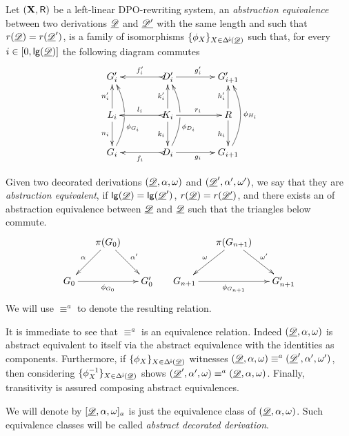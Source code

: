 \begin{definition}Let $(\textbf {\textup{X}}, \mathsf{R})$ be a left-linear DPO-rewriting system,  an \emph{abstraction equivalence} between two derivations $\underline{\mathscr{D}}$ and $\underline{\mathscr{D'}}$ with the same length and such that $r(\underline{\mathscr{D}})=r(\underline{\mathscr{D}}')$, is a family of isomorphisms $\{\phi_X\}_{X\in \Delta^{\hspace{-1pt}\downarrow\hspace{-1pt}}(\underline{\mathscr{D}})}$ such that, for every $i\in [0, \mathsf{lg}(\underline{\mathscr{D}})]$ the following diagram commutes
	\[\xymatrix@C=40pt{G'_i&D'_i \ar[r]^{g'_i} \ar@{>->}[l]_{f'_i}&G'_{i+1}\\  L_i \ar[u]^{n'_i} \ar[d]_{n_i}& K_i \ar[u]^{k'_i} \ar[d]_{k_i} \ar[r]^{r_i} \ar@{>->}[l]_{l_i} &R\ar[u]^{h'_i} \ar[d]_{h_i}\\G_i \ar@/_.45cm/[uu]_(.35){\phi_{G_i}}|\hole&D_i\ar@{>->}[l]^{f_i}\ar@/_.45cm/[uu]_(.35){\phi_{D_i}}|\hole \ar[r]_{g_i}&G_{i+1}\ar@/_.45cm/[uu]_{\phi_{H_i}}}\]
	
	Given two decorated derivations $(\underline{\mathscr{D}}, \alpha, \omega)$ and $(\underline{\mathscr{D}}', \alpha', \omega')$, we say that they are \emph{abstraction equivalent}, if $\mathsf{lg}(\underline{\mathscr{D}})=\mathsf{lg}(\underline{\mathscr{D}}')$, $r(\underline{\mathscr{D}})=r(\underline{\mathscr{D'}})$, and there exists an of abstraction equivalence between $\underline{\mathscr{D}}$ and  $\underline{\mathscr{D}}$ such that the triangles below commute.
	\[\xymatrix@C=15pt{&\pi(G_0) \ar[dr]^{\alpha'} \ar[dl]_{\alpha}&&& \pi(G_{n+1}) \ar[dr]^{\omega'} \ar[dl]_{\omega}\\ G_0 \ar[rr]_{\phi_{G_0}} && G'_0 &G_{n+1} \ar[rr]_{\phi_{G_{n+1}}} && G'_{n+1} } \]
	We will use $\equiv^a$ to denote the resulting relation.
\end{definition}

\begin{remark}\label{rem:equi}
	It is immediate to see that $\equiv^a$ is an equivalence relation. Indeed $(\underline{\mathscr{D}}, \alpha, \omega)$ is abstract equivalent to itself via the abstract equivalence with the identities as components. Furthermore, if  $\{\phi_X\}_{X\in \Delta^{\hspace{-1pt}\downarrow\hspace{-1pt}}(\underline{\mathscr{D}})}$  witnesses $(\underline{\mathscr{D}}, \alpha, \omega)\equiv^a (\underline{\mathscr{D}}', \alpha', \omega')$, then considering $\{\phi^{-1}_X\}_{X\in \Delta^{\hspace{-1pt}\downarrow\hspace{-1pt}}(\underline{\mathscr{D}})}$ shows $(\underline{\mathscr{D}}', \alpha', \omega)\equiv^a (\underline{\mathscr{D}}, \alpha, \omega)$. Finally, transitivity is assured composing abstract equivalences. 
	
	We will denote by $[\underline{\mathscr{D}}, \alpha, \omega]_a$ is just the equivalence class of  $(\underline{\mathscr{D}}, \alpha, \omega)$.
	Such equivalence classes will be called  \emph{abstract decorated derivation}.  
\end{remark}

